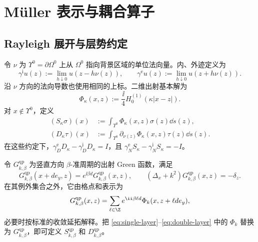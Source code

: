 \section{M\"uller 表示与耦合算子}
\label{sec:muller-coupling}

\subsection{Rayleigh 展开与层势约定}

令 $\nu$ 为 $\Upsilon^0=\partial\Omega^0$ 上从 $\Omega^0$ 指向背景区域的单位法向量。内、外迹定义为
\[
  \gamma^{\mathrm i}u(z):=\lim_{h\downarrow0}u(z-h\nu(z)),
  \qquad
  \gamma^{\mathrm e}u(z):=\lim_{h\downarrow0}u(z+h\nu(z)).
\]
沿 $\nu$ 方向的法向导数也使用相同的上标。二维出射基本解为
\begin{equation}
  \Phi_\kappa(x,z):=\frac{\ii}{4}H_0^{(1)}(\kappa|x-z|).
  \label{eq:fundamental-solution}
\end{equation}
对 $x\notin\Upsilon^0$，定义
\begin{align}
  (S_\kappa\sigma)(x)&:=\int_{\Upsilon^0}\Phi_\kappa(x,z)\sigma(z)\dd s(z),
  \label{eq:single-layer}\\
  (D_\kappa\tau)(x)&:=\int_{\Upsilon^0}
  \partial_{\nu(z)}\Phi_\kappa(x,z)\tau(z)\dd s(z).
  \label{eq:double-layer}
\end{align}
在这些约定下，$\gamma_D^{\mathrm e}D_\kappa-\gamma_D^{\mathrm i}D_\kappa=I$，且 $\gamma_N^{\mathrm e}S_\kappa-\gamma_N^{\mathrm i}S_\kappa=-I$。

令 $G^{\mathrm{qp}}_{k,\beta}$ 为竖直方向 $\beta$-准周期的出射 Green 函数，满足
\[
  G^{\mathrm{qp}}_{k,\beta}(x+de_y,z)
  =e^{\ii\beta d}G^{\mathrm{qp}}_{k,\beta}(x,z),
  \qquad (\Delta_x+k^2)G^{\mathrm{qp}}_{k,\beta}(x,z)=-\delta_z.
\]
在其例外集合之外，它由格点和表示为
\begin{equation}
  G^{\mathrm{qp}}_{k,\beta}(x,z)
  =\sum_{\ell\in\Z}e^{\ii\beta\ell d}
  \Phi_k(x,z+\ell d e_y),
  \label{eq:qp-Green}
\end{equation}
必要时按标准的收敛延拓解释。把 \eqref{eq:single-layer}--\eqref{eq:double-layer} 中的 $\Phi_k$ 替换为 $G^{\mathrm{qp}}_{k,\beta}$，即可定义 $S^{\mathrm{qp}}_{k,\beta}$ 和 $D^{\mathrm{qp}}_{k,\beta}$。

